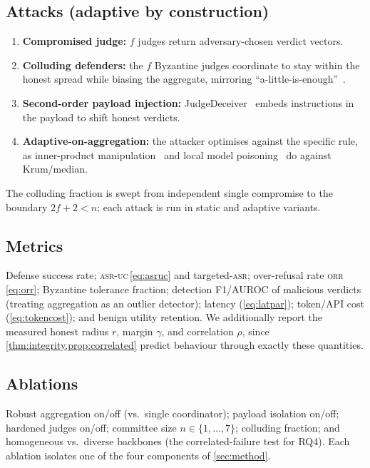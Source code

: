 \subsection{Attacks (adaptive by construction)}
\begin{enumerate}[leftmargin=1.6em,itemsep=1pt,topsep=2pt]
  \item \textbf{Compromised judge:} $f$ judges return adversary-chosen verdict vectors.
  \item \textbf{Colluding defenders:} the $f$ Byzantine judges coordinate to stay within
        the honest spread while biasing the aggregate, mirroring
        ``a-little-is-enough''~\cite{baruch2019little}.
  \item \textbf{Second-order payload injection:} JudgeDeceiver~\cite{shi2024judgeinjection}
        embeds instructions in the payload to shift honest verdicts.
  \item \textbf{Adaptive-on-aggregation:} the attacker optimises against the specific rule,
        as inner-product manipulation~\cite{xie2019fall} and local model
        poisoning~\cite{fang2020poisoning} do against Krum/median.
\end{enumerate}
The colluding fraction is swept from independent single compromise to the boundary
$2f{+}2<n$; each attack is run in static and adaptive variants.

\subsection{Metrics}
Defense success rate; \textsc{asr-uc}\,\eqref{eq:asruc} and targeted-\textsc{asr};
over-refusal rate \textsc{orr}\,\eqref{eq:orr}; Byzantine tolerance fraction; detection
F1/AUROC of malicious verdicts (treating aggregation as an outlier detector); latency
(\cref{eq:latpar}); token/API cost (\cref{eq:tokencost}); and benign utility retention.
We additionally report the measured honest radius $r$, margin $\gamma$, and correlation
$\rho$, since \cref{thm:integrity,prop:correlated} predict behaviour through exactly these
quantities.

\subsection{Ablations}
Robust aggregation on/off (vs.\ single coordinator); payload isolation on/off; hardened
judges on/off; committee size $n\in\{1,\dots,7\}$; colluding fraction; and homogeneous vs.\
diverse backbones (the correlated-failure test for RQ4). Each ablation isolates one of the
four components of \cref{sec:method}.

